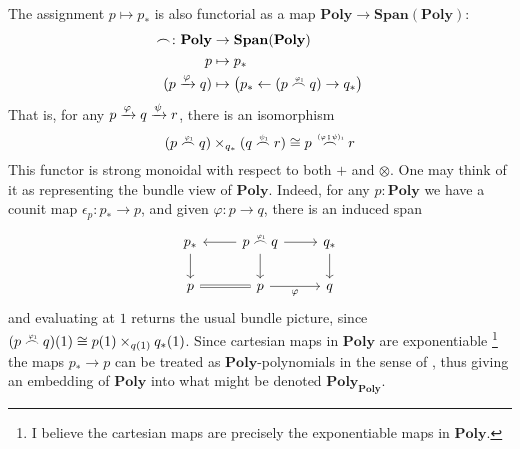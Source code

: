 \documentclass[11pt, one side, article]{memoir}
\theoremstyle{definition}
\theoremstyle{plain}
\newcommand{\Cat}[1]{\mathbf{#1}}%
\newcommand{\then}{\mathbin{\fatsemi}}
\newcommand{\To}[2][]{\xrightarrow[#1]{\tn{$#2$}}}
\newcommand{\from}{\leftarrow}
\newcommand{\tn}[1]{\textnormal{#1}}
\newcommand{\poly}{\Cat{Poly}}
\newcommand{\Span}{\Cat{Span}}
\newcommand{\0}{\textsf{0}}
\newcommand{\1}{\tn{\textsf{1}}}
\newcommand{\indexcoclscale}[1]{\scalebox{.7}{#1}}
\newcommand{\cocl}[1]{
	\scriptsize\overset{\,\indexcoclscale{$#1$}}{\frown}\normalsize
}
\begin{document}
The assignment $p\mapsto p_*$ is also functorial as a map $\poly\to\Span(\poly)$:
\begin{align}
	\cocl{}\colon\poly&\to\Span(\poly)\\
	p&\mapsto p_*\\
	(p\To{\varphi}q)&\mapsto\big( p_*\from(p\cocl{\varphi_1}q)\to q_*\big)
\end{align}\goodbreak
That is, for any $p\To{\varphi}q\To{\psi}r$, there is an isomorphism
\begin{equation}
	(p\cocl{\varphi_1}q)\times_{ q_*}(q\cocl{\psi_1}r)\cong p\cocl{(\varphi\then\psi)_1}r
\end{equation}
This functor is strong monoidal with respect to both $+$ and $\otimes$. One may think of it as representing the bundle view of $\poly$. Indeed, for any $p:\poly$ we have a counit map $\epsilon_p\colon p_*\to p$, and given $\varphi\colon p\to q$, there is an induced span
\begin{equation}
\begin{tikzcd}
	 p_*\ar[d]&p\cocl{\varphi_1}q\ar[d]\ar[l]\ar[r]& q_*\ar[d]\\
	p\ar[r, equal]&p\ar[r,"\varphi"']&q
\end{tikzcd}
\end{equation}
and evaluating at $1$ returns the usual bundle picture, since $(p\cocl{\varphi_1}q)(1)\cong p(1)\times_{q(1)}q_*(1)$. Since cartesian maps in $\poly$ are exponentiable%
\footnote{I believe the cartesian maps are precisely the exponentiable maps in $\poly$.}
the maps $p_*\to p$ can be treated as $\poly$-polynomials in the sense of \cite{weber2015polynomials}, thus giving an embedding of $\poly$ into what might be denoted $\poly_\poly$.
\end{document}
